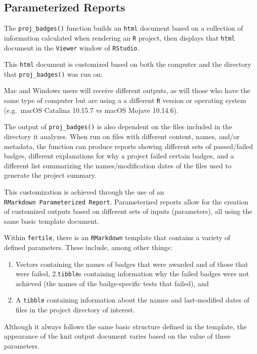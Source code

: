 \documentclass[12pt,twoside]{reedthesis}
\providecommand{\tightlist}{%
  \setlength{\itemsep}{0pt}\setlength{\parskip}{0pt}}
\begin{document}
\hypertarget{parameterized-reports}{%
\subsection{Parameterized Reports}\label{parameterized-reports}}

The \texttt{proj\_badges()} function builds an \texttt{html} document based on a collection of information calculated when rendering an \texttt{R} project, then displays that \texttt{html} document in the \texttt{Viewer} window of \texttt{RStudio}.

This \texttt{html} document is customized based on both the computer and the directory that \texttt{proj\_badges()} was run on:

Mac and Windows users will receive different outputs, as will those who have the same type of computer but are using a a different \texttt{R} version or operating system (e.g.~macOS Catalina 10.15.7 vs macOS Mojave 10.14.6).

The output of \texttt{proj\_badges()} is also dependent on the files included in the directory it analyzes. When run on files with different content, names, and/or metadata, the function can produce reports showing different sets of passed/failed badges, different explanations for why a project failed certain badges, and a different list summarizing the names/modification dates of the files used to generate the project summary.

This customization is achieved through the use of an \texttt{RMarkdown\ Parameterized\ Report}. Parameterized reports allow for the creation of customized outputs based on different sets of inputs (parameters), all using the same basic template document.

Within \texttt{fertile}, there is an \texttt{RMarkdown} template that contains a variety of defined parameters. These include, among other things:
\begin{enumerate}
\def\labelenumi{\arabic{enumi}.}
\tightlist
\item
  Vectors containing the names of badges that were awarded and of those that were failed,
  2.\texttt{tibble}s containing information why the failed badges were not achieved (the names of the badge-specific tests that failed), and
\item
  A \texttt{tibble} containing information about the names and last-modified dates of files in the project directory of interest.
\end{enumerate}
Although it always follows the same basic structure defined in the template, the appearance of the knit output document varies based on the value of these parameters.
\end{document}
